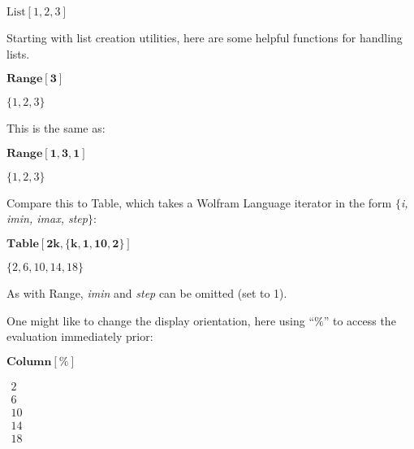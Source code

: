 \documentclass{article}
\begin{document}
\begin{doublespace}
\noindent\(\text{List}[1,2,3]\)
\end{doublespace}

Starting with list creation utilities, here are some helpful functions for handling lists.

\begin{doublespace}
\noindent\(\pmb{\text{Range}[3]}\)
\end{doublespace}

\begin{doublespace}
\noindent\(\{1,2,3\}\)
\end{doublespace}

This is the same as:

\begin{doublespace}
\noindent\(\pmb{\text{Range}[1,3,1]}\)
\end{doublespace}

\begin{doublespace}
\noindent\(\{1,2,3\}\)
\end{doublespace}

Compare this to Table, which takes a Wolfram Language iterator in the form \textit{ $\{$i, imin, imax, step$\}$}:

\begin{doublespace}
\noindent\(\pmb{\text{Table}[2k, \{k,1,10,2\}]}\)
\end{doublespace}

\begin{doublespace}
\noindent\(\{2,6,10,14,18\}\)
\end{doublespace}

As with Range, \textit{ imin} and \textit{ step} can be omitted (set to 1).

One might like to change the display orientation, here using {``}$\%${''} to access the evaluation immediately prior:

\begin{doublespace}
\noindent\(\pmb{\text{Column}[\%]}\)
\end{doublespace}

\begin{doublespace}
\noindent\(\begin{array}{l}
 2 \\
 6 \\
 10 \\
 14 \\
 18 \\
\end{array}\)
\end{doublespace}
\end{document}
